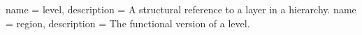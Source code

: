 %
%
%

{
	name        = {level},
	description = {A structural reference to a layer in a hierarchy.}
}
{
	name        = {region},
	description = {The functional version of a \gls{level}.}
}
